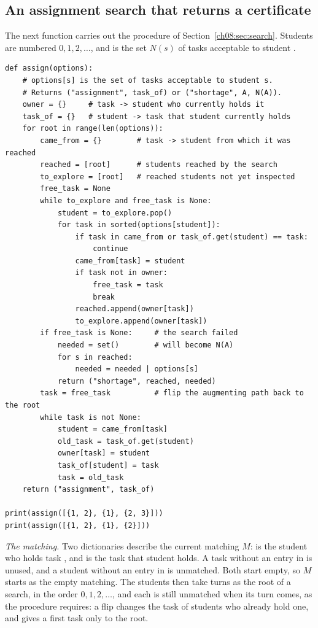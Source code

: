 \subsection*{An assignment search that returns a certificate}
The next function carries out the procedure of Section~\ref{ch08:sec:search}. Students are numbered $0,1,2,\ldots$, and  is the set $N(s)$ of tasks acceptable to student .
\begin{lstlisting}
def assign(options):
    # options[s] is the set of tasks acceptable to student s.
    # Returns ("assignment", task_of) or ("shortage", A, N(A)).
    owner = {}     # task -> student who currently holds it
    task_of = {}   # student -> task that student currently holds
    for root in range(len(options)):
        came_from = {}        # task -> student from which it was reached
        reached = [root]      # students reached by the search
        to_explore = [root]   # reached students not yet inspected
        free_task = None
        while to_explore and free_task is None:
            student = to_explore.pop()
            for task in sorted(options[student]):
                if task in came_from or task_of.get(student) == task:
                    continue
                came_from[task] = student
                if task not in owner:
                    free_task = task
                    break
                reached.append(owner[task])
                to_explore.append(owner[task])
        if free_task is None:     # the search failed
            needed = set()        # will become N(A)
            for s in reached:
                needed = needed | options[s]
            return ("shortage", reached, needed)
        task = free_task          # flip the augmenting path back to the root
        while task is not None:
            student = came_from[task]
            old_task = task_of.get(student)
            owner[task] = student
            task_of[student] = task
            task = old_task
    return ("assignment", task_of)

print(assign([{1, 2}, {1}, {2, 3}]))
print(assign([{1, 2}, {1}, {2}]))
\end{lstlisting}
\emph{The matching.} Two dictionaries describe the current matching $M$:  is the student who holds task , and  is the task that student  holds. A task without an entry in  is unused, and a student without an entry in  is unmatched. Both start empty, so $M$ starts as the empty matching. The students then take turns as the root of a search, in the order $0,1,2,\ldots$, and each is still unmatched when its turn comes, as the procedure requires: a flip changes the task of students who already hold one, and gives a first task only to the root.

